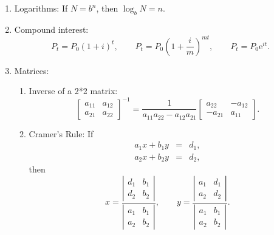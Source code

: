 \begin{enumerate}
	\item Logarithms: If $N=b^{n}$, then $\log _{b}N=n.$
	
	\item Compound interest:%
	\begin{equation*}
	P_{t}=P_{0}\left( 1+i\right) ^{t},\qquad P_{t}=P_{0}\left( 1+\frac{i}{m}%
	\right) ^{mt},\qquad P_{t}=P_{0}\mathrm{e}^{it}.
	\end{equation*}
	
	\item Matrices:
	
	\begin{enumerate}
		\item Inverse of a 2*2 matrix:
		\begin{equation*}
		\left[
		\begin{array}{cc}
		a_{11} & a_{12} \\
		a_{21} & a_{22}%
		\end{array}%
		\right] ^{-1}=\frac{1}{a_{11}a_{22}-a_{12}a_{21}}\left[
		\begin{array}{cc}
		a_{22} & -a_{12} \\
		-a_{21} & a_{11}%
		\end{array}%
		\right] .
		\end{equation*}
		
		
		
		\item Cramer's Rule: If
		\begin{eqnarray*}
			a_{1}x+b_{1}y &=&d_{1}, \\
			a_{2}x+b_{2}y &=&d_{2},
		\end{eqnarray*}%
		then%
		\begin{equation*}
		x=\frac{\left\vert
			\begin{array}{cc}
			d_{1} & b_{1} \\
			d_{2} & b_{2}%
			\end{array}%
			\right\vert }{\left\vert
			\begin{array}{cc}
			a_{1} & b_{1} \\
			a_{2} & b_{2}%
			\end{array}%
			\right\vert },\qquad y=\frac{\left\vert
			\begin{array}{cc}
			a_{1} & d_{1} \\
			a_{2} & d_{2}%
			\end{array}%
			\right\vert }{\left\vert
			\begin{array}{cc}
			a_{1} & b_{1} \\
			a_{2} & b_{2}%
			\end{array}%
			\right\vert }.
		\end{equation*}
	\end{enumerate}
\end{enumerate}

